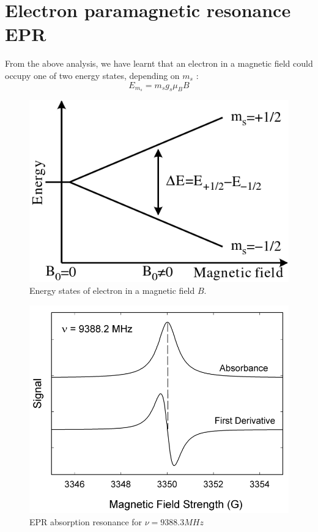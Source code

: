 \section{Electron paramagnetic resonance EPR}
From the above analysis, we have learnt that an electron in a magnetic field could occupy one of two energy states, depending on $m_s$ :
\begin{equation}
E_{m_s} = m_s g_s \mu_B B
\end{equation}
\begin{figure}
	\centering
	\includegraphics[scale = .4]{./figures/epr}
	\caption{Energy states of electron in a magnetic field $B$.}
\end{figure}
\begin{figure}[h!]
	\centering
	\includegraphics[scale = .3]{./figures/eprlines}
	\caption{EPR absorption resonance for $ \nu=9388.3 MHz$}
\end{figure}
